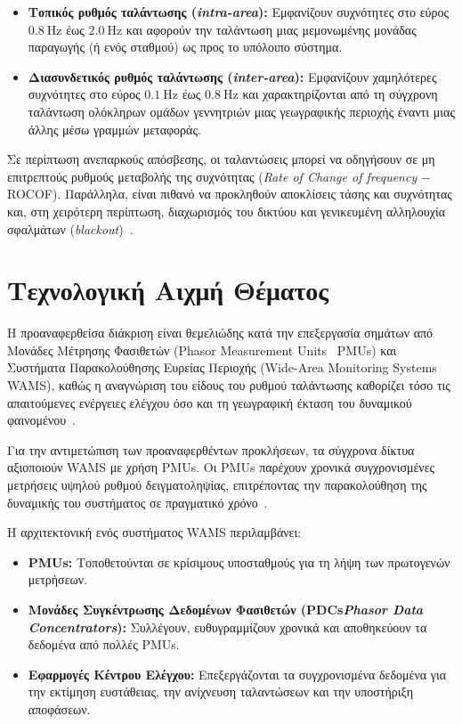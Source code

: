 \begin{itemize}
    \item \textbf{Τοπικός ρυθμός ταλάντωσης (\textenglish{\textit{intra-area}}):} Εμφανίζουν συχνότητες στο εύρος $0.8~\mathrm{Hz}$ έως $2.0~\mathrm{Hz}$ και αφορούν την ταλάντωση μιας μεμονωμένης μονάδας παραγωγής (ή ενός σταθμού) ως προς το υπόλοιπο σύστημα.

    \item \textbf{Διασυνδετικός ρυθμός ταλάντωσης (\textenglish{\textit{inter-area}}):} Εμφανίζουν χαμηλότερες συχνότητες στο εύρος $0.1~\mathrm{Hz}$ έως $0.8~\mathrm{Hz}$ και χαρακτηρίζονται από τη σύγχρονη ταλάντωση ολόκληρων ομάδων γεννητριών μιας γεωγραφικής περιοχής έναντι μιας άλλης μέσω γραμμών μεταφοράς.
\end{itemize}

Σε περίπτωση ανεπαρκούς απόσβεσης, οι ταλαντώσεις μπορεί να οδηγήσουν σε μη επιτρεπτούς ρυθμούς μεταβολής της συχνότητας (\textenglish{\textit{Rate of Change of frequency}} $-$ ROCOF). Παράλληλα, είναι πιθανό να προκληθούν αποκλίσεις τάσης και συχνότητας και, στη χειρότερη περίπτωση, διαχωρισμός του δικτύου και γενικευμένη αλληλουχία σφαλμάτων (\textenglish{\textit{blackout}})~\cite{kundur1994,estimation2021}.

\section{Τεχνολογική Αιχμή Θέματος}

Η προαναφερθείσα διάκριση είναι θεμελιώδης κατά την επεξεργασία σημάτων από Μονάδες Μέτρησης Φασιθετών (\textenglish{Phasor Measurement Units}~\textendash{} PMUs) και Συστήματα Παρακολούθησης Ευρείας Περιοχής (\textenglish{Wide-Area Monitoring Systems}~\textendash{} WAMS), καθώς η αναγνώριση του είδους του ρυθμού ταλάντωσης καθορίζει τόσο τις απαιτούμενες ενέργειες ελέγχου όσο και τη γεωγραφική έκταση του δυναμικού φαινομένου~\cite{klein1991interarea}.

Για την αντιμετώπιση των προαναφερθέντων προκλήσεων, τα σύγχρονα δίκτυα αξιοποιούν WAMS με χρήση PMUs. Οι PMUs παρέχουν χρονικά συγχρονισμένες μετρήσεις υψηλού ρυθμού δειγματοληψίας, επιτρέποντας την παρακολούθηση της δυναμικής του συστήματος σε πραγματικό χρόνο~\cite{estimation2021,modal2018}.

Η αρχιτεκτονική ενός συστήματος WAMS περιλαμβάνει:

\begin{itemize}
    \item \textbf{PMUs:} Τοποθετούνται σε κρίσιμους υποσταθμούς για τη λήψη των πρωτογενών μετρήσεων.

    \item \textbf{Μονάδες Συγκέντρωσης Δεδομένων Φασιθετών (PDCs\textendash{}\textenglish{\textit{Phasor Data Concentrators}}):} Συλλέγουν, ευθυγραμμίζουν χρονικά και αποθηκεύουν τα δεδομένα από πολλές PMUs.

    \item \textbf{Εφαρμογές Κέντρου Ελέγχου:} Επεξεργάζονται τα συγχρονισμένα δεδομένα για την εκτίμηση ευστάθειας, την ανίχνευση ταλαντώσεων και την υποστήριξη αποφάσεων.
\end{itemize}

